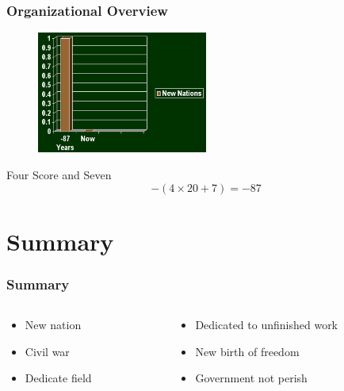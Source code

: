 \documentclass{beamer}
\begin{document}
\begin{frame}
    \frametitle{Organizational Overview}
    \begin{figure}
        \includegraphics[width=0.5\textwidth]{gettysburg_graph}
    \end{figure}
    \begin{block}{Four Score and Seven}
        \begin{equation}
            -\left(4 \times 20 + 7\right) = -87
        \end{equation}
    \end{block}
\end{frame}

\section{Summary}
\begin{frame}
    \frametitle{Summary}
    \begin{columns}
        \begin{column}{0.4\textwidth}
            \begin{itemize}
                \item New nation
                \item Civil war
                \item Dedicate field
            \end{itemize}
        \end{column}
        \begin{column}{0.6\textwidth}
            \begin{itemize}
                \item Dedicated to unfinished work
                \item New birth of freedom
                \item Government not perish
            \end{itemize}
        \end{column}
    \end{columns}
\end{frame}
\end{document}
